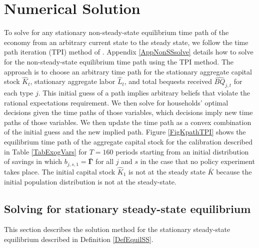 \chapter{Numerical Solution}
%




To solve for any stationary non-steady-state equilibrium time path of the economy from an arbitrary current state to the steady state, we follow the time path iteration (TPI) method of \citet{AuerbachKotlikoff:1987}. Appendix \ref{AppNonSSsolve} details how to solve for the non-steady-state equilibrium time path using the TPI method. The approach is to choose an arbitrary time path for the stationary aggregate capital stock $\hat{K}_t$, stationary aggregate labor $\hat{L}_t$, and total bequests received $\hat{BQ}_{j,t}$ for each type $j$. This initial guess of a path implies arbitrary beliefs that violate the rational expectations requirement. We then solve for households' optimal decisions given the time paths of those variables, which decisions imply new time paths of those variables. We then update the time path as a convex combination of the initial guess and the new implied path. Figure \ref{FigKpathTPI} shows the equilibrium time path of the aggregate capital stock for the calibration described in Table \ref{TabExogVars} for $T=160$ periods starting from an initial distribution of savings in which $b_{j,s,1}=\bm{\bar{\Gamma}}$ for all $j$ and $s$ in the case that no policy experiment takes place. The initial capital stock $\hat{K}_1$ is not at the steady state $\bar{K}$ because the initial population distribution is not at the steady-state.

\section{Solving for stationary steady-state equilibrium}\label{AppSSsolve}

  \setcounter{equation}{0}
  \renewcommand\theenumi{\arabic{enumi}}
  \renewcommand\theenumii{\alph{enumii}}
  \renewcommand\theenumiii{\roman{enumiii}}

  This section describes the solution method for the stationary steady-state equilibrium described in Definition \ref{DefEquilSS}.

